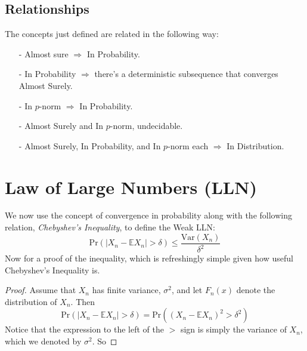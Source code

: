 \documentclass[a4paper,12pt]{scrartcl}
\begin{document}
%

\subsection{Relationships}

The concepts just defined are related in the following way:
\begin{itemize}
   \item[-]{Almost sure $\Rightarrow$ In Probability.}
   \item[-]{In Probability $\Rightarrow$ there's a deterministic 
      subsequence that converges Almost Surely.}
   \item[-]{In $p$-norm $\Rightarrow$ In Probability.}
   \item[-]{Almost Surely and In $p$-norm, undecidable.}
   \item[-]{Almost Surely, In Probability, and In $p$-norm each
      $\Rightarrow$ In Distribution.}
\end{itemize}

\newpage
\section{Law of Large Numbers (LLN)}

We now use the concept of convergence in probability 
along with the following relation, \emph{Chebyshev's Inequality},
to define the Weak LLN:
\begin{equation}
    \label{chebyshev}
    \text{Pr}\left(\left\lvert X_n - \mathbb{E}X_n \right\rvert > 
	\delta\right) \leq \frac{\text{Var}(X_n)}{\delta^2}
\end{equation}
Now for a proof of the inequality, which is refreshingly
simple given how useful Chebyshev's Inequality is.
\begin{proof} Assume that $X_n$ has finite variance, 
    $\sigma^2$, and let $F_n(x)$ denote the distribution
    of $X_n$. Then 
    \begin{equation}
        \label{chebyproof}
        \text{Pr}\left(\left\lvert X_n - \mathbb{E}X_n 
            \right\rvert > \delta\right)
            = \text{Pr}\left(\left( X_n - \mathbb{E}X_n 
            \right)^2 > \delta^2\right)
    \end{equation}
    Notice that the expression to the left of the $>$ sign
    is simply the variance of $X_n$, which we denoted by
    $\sigma^2$. So 
\end{proof}
\end{document}

